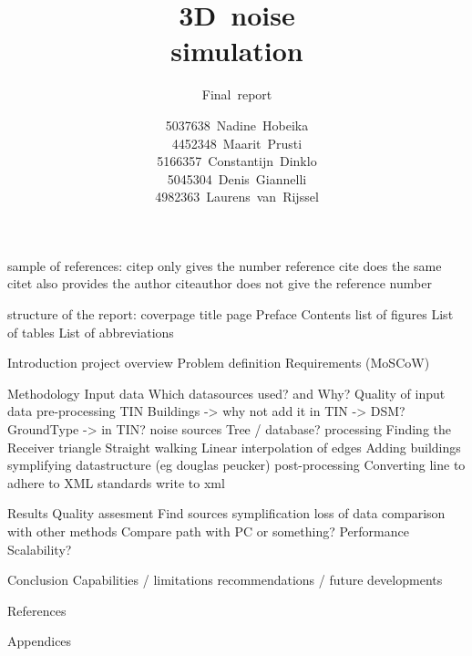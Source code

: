 \documentclass{tudelft-report}
\begin{document}
\frontmatter


\title[tudelft-white]{3D\ noise\\simulation}
\subtitle[tudelft-black]{\Huge Final\ report}
\author[tudelft-white]{\LARGE
5037638\ Nadine\ Hobeika \\
4452348\ Maarit\ Prusti \\
5166357\ Constantijn\ Dinklo\\
5045304\ Denis\ Giannelli\\
4982363\ Laurens\ van\ Rijssel}
\bigskip
{}
\makecover[split]






\tableofcontents

\mainmatter

sample of references:
citep only gives the number reference
cite does the same
citet also provides the author
citeauthor does not give the reference number

structure of the report:
coverpage
title page
Preface
Contents
list of figures
List of tables
List of abbreviations

Introduction
	project overview
	Problem definition
	Requirements (MoSCoW)
	
Methodology
	Input data
		Which datasources used? and Why?
		Quality of input data
	pre-processing
		TIN
		Buildings -> why not add it in TIN -> DSM?
		GroundType -> in TIN?
		noise sources
		Tree / database?
	processing
		Finding the Receiver triangle
		Straight walking
		Linear interpolation of edges
		Adding buildings
		symplifying datastructure (eg douglas peucker)
	post-processing
		Converting line to adhere to XML standards
		write to xml

Results
	Quality assesment
		Find sources
		symplification loss of data
		comparison with other methods
		Compare path with PC or something?
	Performance
	Scalability?

Conclusion
	Capabilities / limitations
	recommendations / future developments

References

Appendices
	
	
		



% 


\appendix

%


\end{document}
